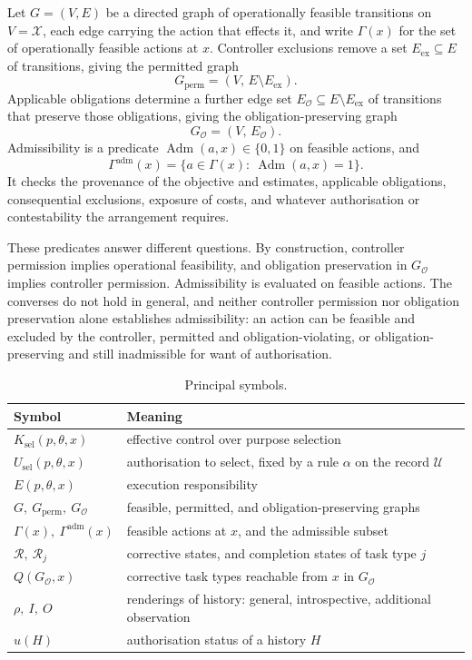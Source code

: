 \documentclass[11pt]{article}
\theoremstyle{definition}
\theoremstyle{remark}
\newcommand{\Adm}{\operatorname{Adm}}
\begin{document}
Let $G=(V,E)$ be a directed graph of operationally feasible transitions on $V=\mathcal X$, each edge carrying the action that effects it, and write $\Gamma(x)$ for the set of operationally feasible actions at $x$. Controller exclusions remove a set $E_{\mathrm{ex}}\subseteq E$ of transitions, giving the permitted graph
\[
G_{\mathrm{perm}}=(V,\,E\setminus E_{\mathrm{ex}}).
\]
Applicable obligations determine a further edge set $E_{\mathcal O}\subseteq E\setminus E_{\mathrm{ex}}$ of transitions that preserve those obligations, giving the obligation-preserving graph
\[
G_{\mathcal O}=(V,\,E_{\mathcal O}).
\]
Admissibility is a predicate $\Adm(a,x)\in\{0,1\}$ on feasible actions, and
\[
\Gamma^{\mathrm{adm}}(x)=\{a\in\Gamma(x):\ \Adm(a,x)=1\}.
\]
It checks the provenance of the objective and estimates, applicable obligations, consequential exclusions, exposure of costs, and whatever authorisation or contestability the arrangement requires.

These predicates answer different questions. By construction, controller permission implies operational feasibility, and obligation preservation in $G_{\mathcal O}$ implies controller permission. Admissibility is evaluated on feasible actions. The converses do not hold in general, and neither controller permission nor obligation preservation alone establishes admissibility: an action can be feasible and excluded by the controller, permitted and obligation-violating, or obligation-preserving and still inadmissible for want of authorisation.

\begin{table}[ht]
\centering
\small
\begin{tabular}{@{}ll@{}}
\toprule
Symbol & Meaning \\
\midrule
$K_{\mathrm{sel}}(p,\theta,x)$ & effective control over purpose selection \\
$U_{\mathrm{sel}}(p,\theta,x)$ & authorisation to select, fixed by a rule $\alpha$ on the record $\mathcal U$ \\
$E(p,\theta,x)$ & execution responsibility \\
$G,\ G_{\mathrm{perm}},\ G_{\mathcal O}$ & feasible, permitted, and obligation-preserving graphs \\
$\Gamma(x),\ \Gamma^{\mathrm{adm}}(x)$ & feasible actions at $x$, and the admissible subset \\
$\mathcal R,\ \mathcal R_j$ & corrective states, and completion states of task type $j$ \\
$Q(G_{\mathcal O},x)$ & corrective task types reachable from $x$ in $G_{\mathcal O}$ \\
$\rho,\ I,\ O$ & renderings of history: general, introspective, additional observation \\
$u(H)$ & authorisation status of a history $H$ \\
\bottomrule
\end{tabular}
\caption{Principal symbols.}
\end{table}
\end{document}

